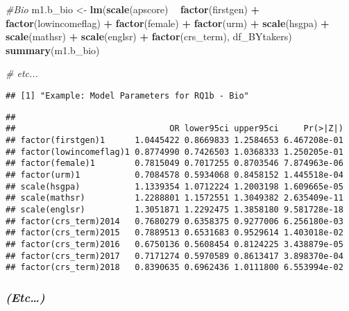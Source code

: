 \documentclass[]{article}
\newenvironment{Shaded}{\begin{snugshade}}{\end{snugshade}}
\newcommand{\KeywordTok}[1]{\textcolor[rgb]{0.13,0.29,0.53}{\textbf{#1}}}
\newcommand{\StringTok}[1]{\textcolor[rgb]{0.31,0.60,0.02}{#1}}
\newcommand{\CommentTok}[1]{\textcolor[rgb]{0.56,0.35,0.01}{\textit{#1}}}
\newcommand{\OperatorTok}[1]{\textcolor[rgb]{0.81,0.36,0.00}{\textbf{#1}}}
\newcommand{\NormalTok}[1]{#1}
\begin{document}
\begin{Shaded}
\begin{Highlighting}[]
\CommentTok{#Bio}
\NormalTok{m1.b_bio <-}\StringTok{ }\KeywordTok{lm}\NormalTok{(}\KeywordTok{scale}\NormalTok{(apscore) }\OperatorTok{~}\StringTok{ }\KeywordTok{factor}\NormalTok{(firstgen) }\OperatorTok{+}\StringTok{ }\KeywordTok{factor}\NormalTok{(lowincomeflag)  }\OperatorTok{+}\StringTok{ }\KeywordTok{factor}\NormalTok{(female) }\OperatorTok{+}\StringTok{ }\KeywordTok{factor}\NormalTok{(urm) }\OperatorTok{+}
\StringTok{                }\KeywordTok{scale}\NormalTok{(hsgpa) }\OperatorTok{+}\StringTok{ }\KeywordTok{scale}\NormalTok{(mathsr) }\OperatorTok{+}\StringTok{ }\KeywordTok{scale}\NormalTok{(englsr) }\OperatorTok{+}\StringTok{ }\KeywordTok{factor}\NormalTok{(crs_term),}
\NormalTok{              df_BYtakers)}
\KeywordTok{summary}\NormalTok{(m1.b_bio)}

\CommentTok{# etc...}
\end{Highlighting}
\end{Shaded}

\begin{verbatim}
## [1] "Example: Model Parameters for RQ1b - Bio"
\end{verbatim}

\begin{verbatim}
##  
##                               OR lower95ci upper95ci     Pr(>|Z|)
## factor(firstgen)1      1.0445422 0.8669833 1.2584653 6.467208e-01
## factor(lowincomeflag)1 0.8774990 0.7426503 1.0368333 1.250205e-01
## factor(female)1        0.7815049 0.7017255 0.8703546 7.874963e-06
## factor(urm)1           0.7084578 0.5934068 0.8458152 1.445518e-04
## scale(hsgpa)           1.1339354 1.0712224 1.2003198 1.609665e-05
## scale(mathsr)          1.2288801 1.1572551 1.3049382 2.635409e-11
## scale(englsr)          1.3051871 1.2292475 1.3858180 9.581728e-18
## factor(crs_term)2014   0.7680279 0.6358375 0.9277006 6.256180e-03
## factor(crs_term)2015   0.7889513 0.6531683 0.9529614 1.403018e-02
## factor(crs_term)2016   0.6750136 0.5608454 0.8124225 3.438879e-05
## factor(crs_term)2017   0.7171274 0.5970589 0.8613417 3.898370e-04
## factor(crs_term)2018   0.8390635 0.6962436 1.0111800 6.553994e-02
\end{verbatim}

\subsubsection{\texorpdfstring{\emph{(Etc\ldots{})}}{(Etc\ldots{})}}\label{etc}
\end{document}
